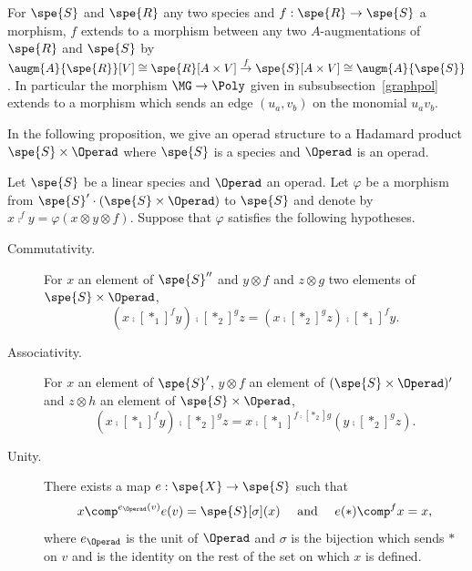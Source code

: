 \begin{rema} \label{rem_bij_graphpol}
    For $\spe{S}$ and $\spe{R}$ any two species and $f:\spe{R}\to\spe{S}$ a morphism, $f$ extends to a 
    morphism between any two $A$-augmentations of $\spe{R}$ and $\spe{S}$ by 
    $\augm{A}{\spe{R}}[V]\cong\spe{R}[A\times V]\stackrel{f}{\to}\spe{S}[A\times V]\cong\augm{A}{\spe{S}}$. 
    In particular the morphism $\MG\to\Poly$ given in subsubsection~\ref{graphpol} extends to a morphism 
    which sends an edge $(u_a,v_b)$ on the monomial $u_av_b$.
\end{rema}

In the following proposition, we give an operad structure to a Hadamard product $\spe{S}\times\Operad$ 
where $\spe{S}$ is a species and $\Operad$ is an operad. 
\begin{prop}\label{prop_semiprod}
    Let $\spe{S}$ be a linear species and $\Operad$ an operad. Let $\varphi$ be a morphism from 
    $\spe{S}'\cdot(\spe{S}\times\Operad)$ to $\spe{S}$ and denote by $x\comp^f y=\varphi(x\otimes y\otimes f)$.
    Suppose that $\varphi$ satisfies the following hypotheses. 
    \begin{description}
        \item[Commutativity.] For $x$ an element of $\spe{S}''$ and $y\otimes f$ and $z\otimes g$ two elements 
        of $\spe{S}\times\Operad$,
        \begin{equation}\label{prod_sd_eq1}
            (x\comp[\ast_1]^f y)\comp[\ast_2]^g z  = (x\comp[\ast_2]^g z)\comp[\ast_1]^f y.
        \end{equation}
        \item[Associativity.] For $x$ an element of $\spe{S}'$, $y\otimes f$ an element of 
        $(\spe{S}\times\Operad)'$ and $z\otimes h$ an element of $\spe{S}\times\Operad$,
        \begin{equation}\label{prod_sd_eq2} 
            (x\comp[\ast_1]^f y)\comp[\ast_2]^g z = x\comp[\ast_1]^{f\comp[\ast_2] g}(y\comp[\ast_2]^g z).
        \end{equation}
        \item[Unity.] There exists a map $e:\spe{X}\rightarrow \spe{S}$ such that 
        \begin{equation}\label{prod_sd_eq3}
            x\comp^{e_{\Operad}(v)}e(v) = \spe{S}[\sigma](x) \quad \text{ and }\quad e(\ast)\comp^f x = x,
        \end{equation} 
        where $e_{\Operad}$ is the unit of $\Operad$ and $\sigma$ is the bijection which sends $\ast$ on 
        $v$ and is the identity on the rest of the set on which $x$ is defined.

\end{description}
\end{prop}
